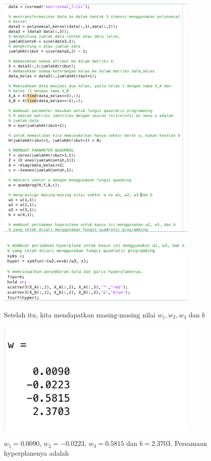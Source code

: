 \documentclass[12pt]{article}%
\begin{document}
\begin{enumerate}
\begin{enumerate}
		\par \includegraphics[width=10cm]{ass2clo3no18_4}
		\par \includegraphics[width=10cm]{ass2clo3no18_5}  

		\par
		\par Setelah itu, kita mendapatkan masing-masing nilai $w_1, w_2, w_3$ dan $b$
		\par \includegraphics[width=10cm]{ass2clo3no18_6}

		\par $w_1 = 0.0090$, $w_2 = -0.0223$, $w_3 = 0.5815$ dan $b = 2.3703$. Persamaan hyperplanenya adalah 


\end{enumerate}
\end{enumerate}
\end{document}
